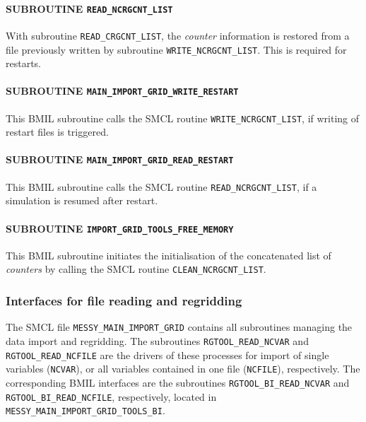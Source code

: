 \documentclass[11pt,twoside]{report}
\begin{document}
\paragraph{SUBROUTINE \color{blue} \tt\bf READ\_NCRGCNT\_LIST\\ \label{IGCNTLISTREAD}}
With subroutine \verb|READ_CRGCNT_LIST|, the {\it counter} information
is restored from a file previously written by
subroutine \verb|WRITE_NCRGCNT_LIST|. This is required for restarts.
\paragraph{SUBROUTINE \color{blue} \tt\bf MAIN\_IMPORT\_GRID\_WRITE\_RESTART\\ \label{IGWRITERST}}
This BMIL subroutine calls the SMCL routine \verb|WRITE_NCRGCNT_LIST|,
if writing of restart files is triggered. 
\paragraph{SUBROUTINE \color{blue} \tt\bf MAIN\_IMPORT\_GRID\_READ\_RESTART\\ \label{IGREADRST}}
This BMIL subroutine calls the SMCL routine \verb|READ_NCRGCNT_LIST|,
if a simulation is resumed after restart.
\paragraph{SUBROUTINE \color{blue} \tt\bf IMPORT\_GRID\_TOOLS\_FREE\_MEMORY\\ \label{IGFREEMEM}}
This BMIL subroutine initiates the initialisation of the concatenated
list of {\it counters} by calling the SMCL routine \verb|CLEAN_NCRGCNT_LIST|.


\subsubsection{Interfaces for file reading and regridding\label{IGREAD}}
The SMCL file \verb|MESSY_MAIN_IMPORT_GRID| contains all subroutines
 managing the data import and regridding.
The subroutines \verb|RGTOOL_READ_NCVAR| and 
\verb|RGTOOL_READ_NCFILE| are the drivers of these processes for import of
single variables (\verb|NCVAR|), or all variables contained in one file 
(\verb|NCFILE|), respectively. The corresponding BMIL interfaces are
the subroutines \verb|RGTOOL_BI_READ_NCVAR| and  
\verb|RGTOOL_BI_READ_NCFILE|, respectively, located
in \verb|MESSY_MAIN_IMPORT_GRID_TOOLS_BI|.  
\end{document}
